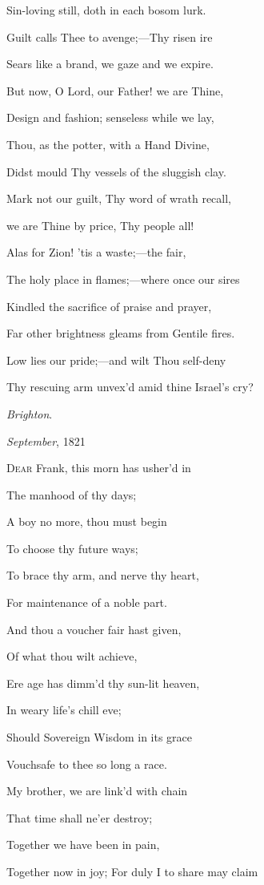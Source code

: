 Sin-loving still, doth in each bosom lurk.

Guilt calls Thee to avenge;—Thy risen ire

Sears like a brand, we gaze and we expire.

But now, O Lord, our Father! we are Thine,

Design and fashion; senseless while we lay,

Thou, as the potter, with a Hand Divine,

Didst mould Thy vessels of the sluggish clay.

Mark not our guilt, Thy word of wrath recall,

we are Thine by price, Thy people all!

Alas for Zion! 'tis a waste;—the fair,

The holy place in flames;—where once our sires

Kindled the sacrifice of praise and prayer,

Far other brightness gleams from Gentile fires.

Low lies our pride;—and wilt Thou self-deny

Thy rescuing arm unvex'd amid thine Israel's cry?

\emph{Brighton}.

\emph{September}, 1821


D\textsc{ear} Frank, this morn has usher'd in

The manhood of thy days;

A boy no more, thou must begin

To choose thy future
ways;

To brace thy arm, and nerve thy heart,

For maintenance of a noble part.

And thou a voucher fair hast given,

Of what thou wilt
achieve,

Ere age has dimm'd thy sun-lit heaven,

In weary life's chill
eve;

Should Sovereign Wisdom in its grace

Vouchsafe to thee so long a race.

My brother, we are link'd with chain

That time shall ne'er
destroy;

Together we have been in pain,

Together now in joy; For duly I to share may claim

